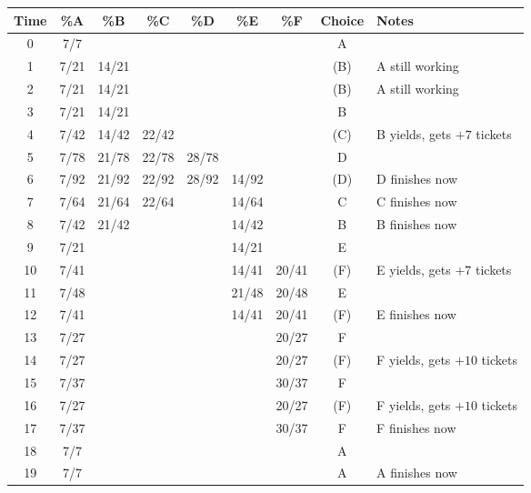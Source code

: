\documentclass[11pt]{article} %
\begin{document}
\begin{center}
  {
  \begin{tabular}{|c|c|c|c|c|c|c|c|p{5cm}|}
    \hline
    \textbf{Time} & \textbf{\%A} & \textbf{\%B} & \textbf{\%C} & \textbf{\%D} &
    \textbf{\%E} & \textbf{\%F} & \textbf{Choice} & \textbf{Notes}\\
    \hline
    0 & 7/7 & & & & & & A & \\
    1 & 7/21 & 14/21 & & & & & (B) & A still working\\
    2 & 7/21 & 14/21 & & & & & (B) & A still working\\
    3 & 7/21 & 14/21 & & & & & B & \\
    4 & 7/42 & 14/42 & 22/42 & & & & (C) & B yields, gets $+7$ tickets\\
    5 & 7/78 & 21/78 & 22/78 & 28/78 & & & D & \\
    6 & 7/92 & 21/92 & 22/92 & 28/92 & 14/92 & & (D) & D finishes now\\
    7 & 7/64 & 21/64 & 22/64 & & 14/64 & & C & C finishes now\\
    8 & 7/42 & 21/42 & & & 14/42 & & B & B finishes now\\
    9 & 7/21 & & & & 14/21 & & E & \\
    10 & 7/41 & & & & 14/41 & 20/41 & (F) & E yields, gets $+7$ tickets\\
    11 & 7/48 & & & & 21/48 & 20/48 & E & \\
    12 & 7/41 & & & & 14/41 & 20/41 & (F) & E finishes now\\
    13 & 7/27 & & & & & 20/27 & F & \\
    14 & 7/27 & & & & & 20/27 & (F) & F yields, gets $+10$ tickets \\
    15 & 7/37 & & & & & 30/37 & F & \\
    16 & 7/27 & & & & & 20/27 & (F) & F yields, gets $+10$ tickets \\
    17 & 7/37 & & & & & 30/37 & F & F finishes now\\
    18 & 7/7 & & & & & & A & \\
    19 & 7/7 & & & & & & A & A finishes now\\


    \hline
  \end{tabular}
  }
\end{center}
\end{document}
